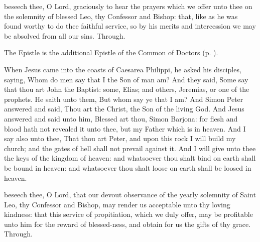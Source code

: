 \collect
{} beseech thee, O Lord, graciously to hear the prayers which we offer unto thee on the solemnity of blessed Leo, thy Confessor and Bishop: that, like as he was found worthy to do thee faithful service, so by his merits and intercession we may be absolved from all our sins. Through.

\begin{rubric}
	The Epistle is the additional Epistle of the Common of Doctors (p. \pageref{Ecclesiasticus395}).
\end{rubric}


\tractalleluianotice


 When Jesus came into the coasts of Caesarea Philippi, he asked his disciples, saying, Whom do men say that I the Son of man am? And they said, Some say that thou art John the Baptist: some, Elias; and others, Jeremias, or one of the prophets. He saith unto them, But whom say ye that I am? And Simon Peter answered and said, Thou art the Christ, the Son of the living God. And Jesus answered and said unto him, Blessed art thou, Simon Barjona: for flesh and blood hath not revealed it unto thee, but my Father which is in heaven. And I say also unto thee, That thou art Peter, and upon this rock I will build my church; and the gates of hell shall not prevail against it. And I will give unto thee the keys of the kingdom of heaven: and whatsoever thou shalt bind on earth shall be bound in heaven: and whatsoever thou shalt loose on earth shall be loosed in heaven.


\secret
{} beseech thee, O Lord, that our devout observance of the yearly solemnity of Saint Leo, thy Confessor and Bishop, may render us acceptable unto thy loving kindness: that this service of propitiation, which we duly offer, may be profitable unto him for the reward of blessed-ness, and obtain for us the gifts of thy grace. Through.

